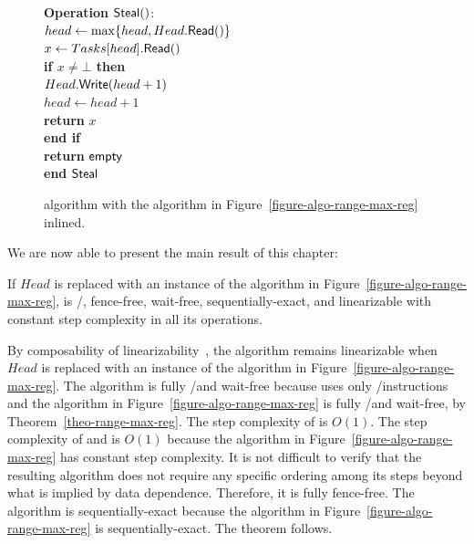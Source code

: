 \begin{figure}[H]
{{\begin{minipage}[t]{150mm}
\begin{tabbing}
          {\bf Operation} \({\sf Steal}()\): \\
           \> \> \(head \leftarrow \max\{head, Head.{\sf Read}()\}\)\\
           \> \> \(x \leftarrow Tasks[head].{\sf Read}()\) \\
           \> \> {\bf if \(x \neq \bot\) then}\\
           \> \> \> \(Head.{\sf Write}(head+1)\)\\
           \> \> \> \(head \leftarrow head+1\)\\
           \> \> \> {\bf return} \(x\)\\
           \> \> {\bf end if}\\
           \> \> {\bf return} ${\sf empty}$\\
          {\bf end} ${\sf Steal}$

        \end{tabbing}
      \end{minipage} }
    \caption{\label{figure-w-mult}\NCWSM algorithm with the \RangeMaxReg
      algorithm in Figure~\ref{figure-algo-range-max-reg} inlined.}
  }
\end{figure}

We are now able to present the main result of this chapter:
\vspace{1cm}
\begin{theorem}\label{theo-wf-fully}
If \(Head\) is replaced with an instance of the algorithm in Figure~\ref{figure-algo-range-max-reg}, \NCWSM is \R/\W, fence-free, wait-free, sequentially-exact, and linearizable with constant step complexity in all its operations.
\end{theorem}

\begin{proofT}
By composability of linearizability~\cite{DBLP_journals_toplas_HerlihyW90}, the algorithm remains linearizable when \(Head\) is replaced with an instance of the algorithm in Figure~\ref{figure-algo-range-max-reg}. The algorithm is fully \R/\W and wait-free because \Put uses only \R/\W instructions and the \RangeMaxReg algorithm in Figure~\ref{figure-algo-range-max-reg} is fully \R/\W and wait-free, by Theorem~\ref{theo-range-max-reg}. The step complexity of \Put is $O(1)$. The step complexity of \Take and \Steal is $O(1)$ because the \RangeMaxReg algorithm in Figure~\ref{figure-algo-range-max-reg} has constant step complexity. It is not difficult to verify that the resulting algorithm does not require any specific ordering among its steps beyond what is implied by data dependence. Therefore, it is fully fence-free. The algorithm is sequentially-exact because the algorithm in Figure~\ref{figure-algo-range-max-reg} is sequentially-exact. The theorem follows.
\end{proofT}

